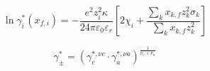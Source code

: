\documentclass[12pt, letterpaper]{article}
\begin{document}

\begin{equation}
    \ln\gamma_{i}^{*}\left(x_{f,i}\right)=-\frac{e^{2}z_{i}^{2}\kappa}{24\pi\varepsilon_{0}\varepsilon_{r}}\left[2\chi_{i}+\frac{\sum_{k}x_{k,f}z_{k}^{2}\sigma_{k}}{\sum_{k}x_{k,f}z_{k}^{2}}\right]
    \label{eq:lngamma_i_infinite_dilution}
\end{equation}


\begin{equation}
    \gamma_{\pm}^{*}=(\gamma_{c}^{*,\nu c}\cdot\gamma_{a}^{*,\nu a})^{\frac{1}{\nu_{c}+\nu_{a}}}
    \label{eq:gamma_pm_x}
\end{equation}



\printbibliography
\end{document}
